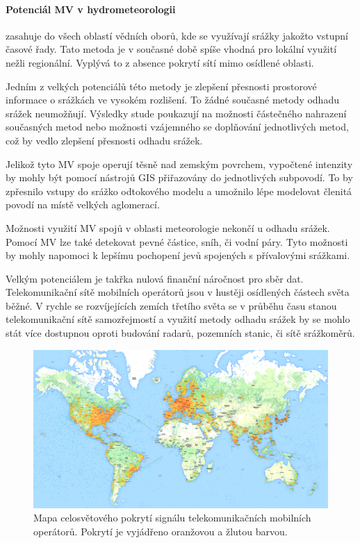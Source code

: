 \documentclass[a4paper,12pt]{article}
\begin{document}
\paragraph*{Potenciál MV v hydrometeorologii} zasahuje do všech oblastí vědních oborů, kde se využívají srážky jakožto vstupní časové řady. Tato metoda je v současné době spíše vhodná pro lokální využití nežli regionální. Vyplývá to z absence pokrytí sítí mimo osídlené oblasti. 

Jedním z velkých potenciálů této metody je zlepšení přesnosti prostorové informace o srážkách ve vysokém rozlišení. To žádné současné metody odhadu srážek neumožňují. Výsledky stude\cite{mv2} poukazují na možnosti částečného nahrazení současných metod nebo možnosti vzájemného se doplňování jednotlivých metod, což by vedlo zlepšení přesnosti odhadu srážek. 

Jelikož tyto MV spoje operují těsně nad zemským povrchem, vypočtené intenzity by mohly být pomocí nástrojů \acs{GIS} přiřazovány do jednotlivých subpovodí. To by zpřesnilo vstupy do srážko odtokového modelu a umožnilo lépe modelovat členitá povodí na místě velkých aglomerací.

Možnosti využití MV spojů v oblasti meteorologie nekončí u odhadu srážek. Pomocí MV lze také detekovat pevné částice, sníh, či vodní páry. Tyto možnosti by mohly napomoci k lepšímu pochopení jevů spojených s přívalovými srážkami.\cite{mv2}

Velkým potenciálem je takřka nulová finanční náročnost pro sběr dat. Telekomunikační sítě mobilních operátorů jsou v hustěji osídlených částech světa běžné. V rychle se rozvíjejících zemích třetího světa se v průběhu času stanou telekomunikační sítě samozřejmostí a využití metody odhadu srážek by se mohlo stát více dostupnou oproti budování radarů, pozemních stanic, či sítě srážkoměrů.
 
\begin{figure}[h!]
    \centering
    \includegraphics[width=1\textwidth]{./img/srazky/opensignalmap.png}
    \caption[Porytí tel. sítí]{\centering Mapa celosvětového pokrytí signálu telekomunikačních mobilních operátorů. Pokrytí je vyjádřeno oranžovou a žlutou barvou. \footnotemark }
 \end{figure}   
\end{document}

